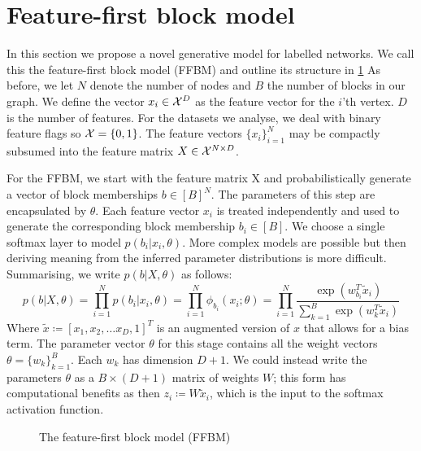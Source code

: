 \section{Feature-first block model}

In this section we propose a novel generative model for labelled networks. We call this the feature-first block model (FFBM) and outline its structure in \ref{fig:ffbm} As before, we let $N$ denote the number of nodes and $B$ the number of blocks in our graph. We define the vector $x_i \in \mathcal{X}^D$ as the feature vector for the $i$'th vertex. $D$ is the number of features. For the datasets we analyse, we deal with binary feature flags so $\mathcal{X} = \{0, 1\}$. The feature vectors $\{x_i\}_{i=1}^{N}$ may be compactly subsumed into the feature matrix $X \in \mathcal{X}^{N \times D}$.

For the FFBM, we start with the feature matrix X and probabilistically generate a vector of block memberships $b \in [B]^N$. The parameters of this step are encapsulated by $\theta$. Each feature vector $x_i$ is treated independently and used to generate the corresponding block membership $b_i \in [B]$. We choose a single softmax layer to model $p(b_i | x_i, \theta)$. More complex models are possible but then deriving meaning from the inferred parameter distributions is more difficult. Summarising, we write $p(b | X, \theta)$ as follows:
%
\begin{equation}
	p(b| X, \theta) = \prod_{i=1}^{N} p(b_i | x_i, \theta) = \prod_{i=1}^{N} \phi_{b_i} (x_i; \theta)
	= \prod_{i=1}^{N} \frac{\exp\left(w_{b_i}^T \tilde{x}_i\right)}{\sum_{k=1}^{B} \exp \left( w_k^T \tilde{x}_i\right)}
\end{equation}
%
Where $\tilde{x} \coloneqq \left[x_1, x_2, \dots x_D, 1\right]^T$ is an augmented version of $x$ that allows for a bias term. The parameter vector $\theta$ for this stage contains all the weight vectors $\theta = \{w_k\}_{k=1}^{B}$. Each $w_k$ has dimension $D+1$. We could instead write the parameters $\theta$ as a $B \times (D+1)$ matrix of weights $W$; this form has computational benefits as then $z_i \coloneqq W \tilde{x}_i$, which is the input to the softmax activation function.

\begin{figure}[!h]
	\centering
	\caption{The feature-first block model (FFBM)}
	\label{fig:ffbm}
\end{figure}

